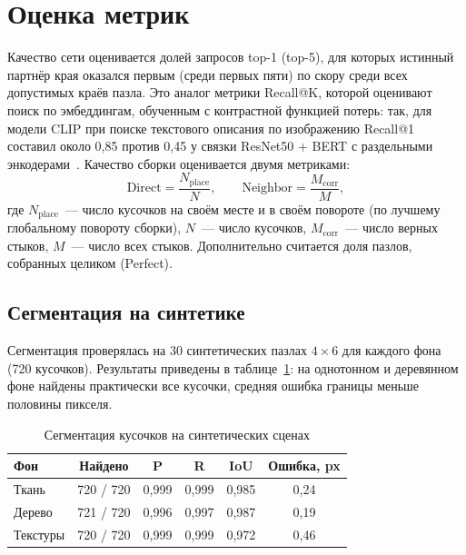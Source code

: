\documentclass{misisarticle}
\begin{document}
\section{Оценка метрик}

Качество сети оценивается долей запросов top-1 (top-5), для которых истинный партнёр края оказался первым (среди первых пяти) по скору среди всех допустимых краёв пазла. Это аналог метрики Recall@K, которой оценивают поиск по эмбеддингам, обученным с контрастной функцией потерь: так, для модели CLIP при поиске текстового описания по изображению Recall@1 составил около 0,85 против 0,45 у связки ResNet50 + BERT с раздельными энкодерами~\cite{shevchenko2026}. Качество сборки оценивается двумя метриками:
\begin{equation}
  \mathrm{Direct} = \frac{N_{\mathrm{place}}}{N}, \qquad \mathrm{Neighbor} = \frac{M_{\mathrm{corr}}}{M},
  \label{eq:metrics}
\end{equation}
где $N_{\mathrm{place}}$~--- число кусочков на своём месте и в своём повороте (по лучшему глобальному повороту сборки), $N$~--- число кусочков, $M_{\mathrm{corr}}$~--- число верных стыков, $M$~--- число всех стыков. Дополнительно считается доля пазлов, собранных целиком (Perfect).

\subsection{Сегментация на синтетике}

Сегментация проверялась на 30 синтетических пазлах $4\times6$ для каждого фона (720 кусочков). Результаты приведены в таблице~\ref{tab:seg}: на однотонном и деревянном фоне найдены практически все кусочки, средняя ошибка границы меньше половины пикселя.

\begin{table}[htbp]
  \caption{Сегментация кусочков на синтетических сценах}
  \label{tab:seg}
  \centering
  \setlength{\tabcolsep}{4pt}
  \begin{tabular}{@{}lccccc@{}}
    \toprule
    \textbf{Фон} & \textbf{Найдено} & \textbf{P} & \textbf{R} & \textbf{IoU} & \textbf{Ошибка, px} \\
    \midrule
    Ткань    & 720 / 720 & 0,999 & 0,999 & 0,985 & 0,24 \\
    Дерево   & 721 / 720 & 0,996 & 0,997 & 0,987 & 0,19 \\
    Текстуры & 720 / 720 & 0,999 & 0,999 & 0,972 & 0,46 \\
    \bottomrule
  \end{tabular}
\end{table}
\end{document}
